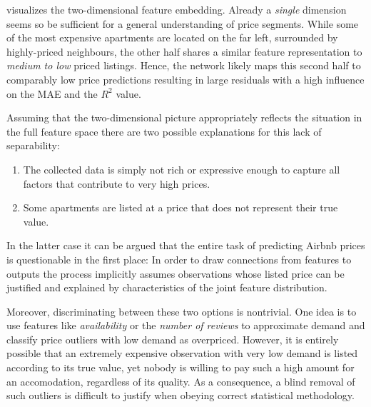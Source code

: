  visualizes the two-dimensional feature embedding.
Already a \emph{single} dimension seems so be sufficient for a general understanding of price segments.
While some of the most expensive apartments are located on the far left, surrounded by highly-priced neighbours, the other half shares a similar feature representation to \emph{medium to low} priced listings.
Hence, the network likely maps this second half to comparably low price predictions resulting in large residuals with a high influence on the MAE and the $R^2$ value.

Assuming that the two-dimensional picture appropriately reflects the situation in the full feature space there are two possible explanations for this lack of separability:
\begin{enumerate}
  \item The collected data is simply not rich or expressive enough to capture all factors that contribute to very high prices.
  \item Some apartments are listed at a price that does not represent their true value.
\end{enumerate}

In the latter case it can be argued that the entire task of predicting Airbnb prices is questionable in the first place:
In order to draw connections from features to outputs the process implicitly assumes observations whose listed price can be justified and explained by characteristics of the joint feature distribution.

Moreover, discriminating between these two options is nontrivial.
One idea is to use features like \emph{availability} or the \emph{number of reviews} to approximate demand and classify price outliers with low demand as overpriced.
However, it is entirely possible that an extremely expensive observation with very low demand is listed according to its true value, yet nobody is willing to pay such a high amount for an accomodation, regardless of its quality.
As a consequence, a blind removal of such outliers is difficult to justify when obeying correct statistical methodology.












